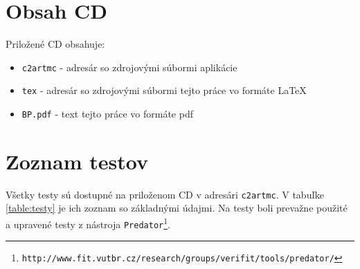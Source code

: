





\chapter{Obsah CD}
Priložené CD obsahuje:
\begin{itemize}
\item \texttt{c2artmc} - adresár so zdrojovými súbormi aplikácie
\item \texttt{tex} - adresár so zdrojovými súbormi tejto práce vo formáte \LaTeX
\item \texttt{BP.pdf} - text tejto práce vo formáte pdf  
\end{itemize}

\chapter{Zoznam testov}
\label{priloha:testy}
Všetky testy sú dostupné na priloženom CD v adresári \texttt{c2artmc}. V tabuľke \ref{table:testy} je ich zoznam so základnými údajmi. Na testy boli prevažne použité a upravené testy z nástroja \texttt{Predator\footnote{http://www.fit.vutbr.cz/research/groups/verifit/tools/predator/}}.

